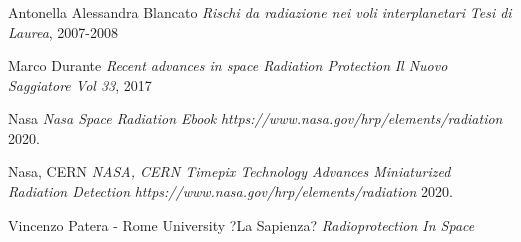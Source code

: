 \documentclass[9pt]{beamer}
\begin{document}
\begin{frame}
\frametitle{\refname}
   \begin{thebibliography}{9}
   \small
   

       Antonella Alessandra Blancato
      \newblock \textit{Rischi da radiazione nei voli interplanetari}
      \newblock \emph{Tesi di Laurea}, 2007-2008
      
       Marco Durante
      \newblock \textit{Recent advances in space Radiation Protection}
      \newblock \emph{Il Nuovo Saggiatore Vol 33}, 2017
      
       Nasa
      \newblock \textit{Nasa Space Radiation Ebook}
      \newblock \emph{https://www.nasa.gov/hrp/elements/radiation} 2020.
      
       Nasa, CERN
      \newblock \textit{NASA, CERN Timepix Technology Advances Miniaturized Radiation Detection}
      \newblock \emph{https://www.nasa.gov/hrp/elements/radiation} 2020.

       Vincenzo Patera - Rome University ?La Sapienza?
      \newblock \textit{Radioprotection In Space}

      
   \end{thebibliography}
\end{frame}
\end{document}
